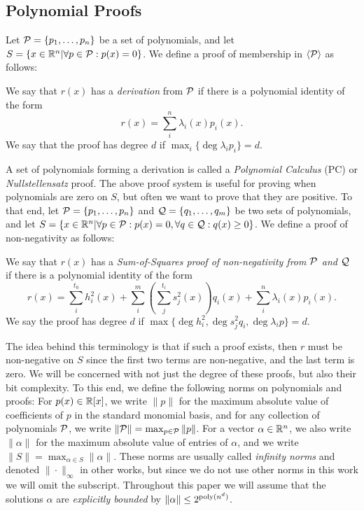\subsection{Polynomial Proofs}
Let $\mathcal P = \{p_1,\dots,p_n\}$ be a set of polynomials, and let $S = \{x \in \mathbb R^n | \forall p \in \mathcal P: p(x) = 0\}$. We define a proof of membership in $\langle \mathcal P\rangle$ as follows:
\begin{definition}
We say that $r(x)$ has a \emph{derivation} from $\mathcal P$ if there is a polynomial identity of the form
\[r(x) = \sum_{i}^n \lambda_i(x) p_i(x).\]
We say that the proof has degree $d$ if $\max_i \{\deg \lambda_i p_i\} = d$.
\end{definition}

A set of polynomials forming a derivation is called a \emph{Polynomial Calculus} (PC) or \emph{Nullstellensatz} proof. The above proof system is useful for proving when polynomials are zero on $S$, but often we want to prove that they are positive. To that end, let $\mathcal P = \{p_1,\dots,p_n\}$ and $\mathcal Q = \{q_1,\dots,q_m\}$ be two sets of polynomials, and let $S = \{x \in \mathbb R^n | \forall p \in \mathcal P: p(x) = 0, \forall q \in \mathcal Q: q(x) \geq 0\}$. We define a proof of non-negativity as follows:
\begin{definition}
 We say that $r(x)$ has a \emph{Sum-of-Squares proof of non-negativity from $\mathcal P$ and $\mathcal Q$} if there is a polynomial identity of the form
\[r(x) = \sum_{i}^{t_0} h_i^2(x) + \sum_{i}^m \left(\sum_{j}^{t_i} s_j^2(x)\right)q_i(x) + \sum_{i}^n \lambda_i(x) p_i(x).\]
We say the proof has degree $d$ if $\max \{\deg h_i^2, \deg s_j^2q_i, \deg \lambda_i p\} = d$.
\end{definition}
The idea behind this terminology is that if such a proof exists, then $r$ must be non-negative on $S$ since the first two terms are non-negative, and the last term is zero. We will be concerned with not just the degree of these proofs, but also their bit complexity. To this end, we define the following norms on polynomials and proofs: For $p(x) \in \mathbb R[x]$, we write $\|p\|$ for the maximum absolute value of coefficients of $p$ in the standard monomial basis, and for any collection of polynomials $\mathcal P$, we write $\|\mathcal P\| = \max_{p \in \mathcal P} \|p\|$. For a vector $\alpha \in \mathbb R^n$, we also write $\|\alpha\|$ for the maximum absolute value of entries of $\alpha$, and we write $\|S\| = \max_{\alpha \in S} \|\alpha\|$. These norms are usually called \emph{infinity norms} and denoted $\| \cdot \|_\infty$ in other works, but since we do not use other norms in this work we will omit the subscript. Throughout this paper we will assume that the solutions $\alpha$ are {\it explicitly bounded} by $\|\alpha\| \leq 2^{\operatorname{poly}(n^d)}$.

